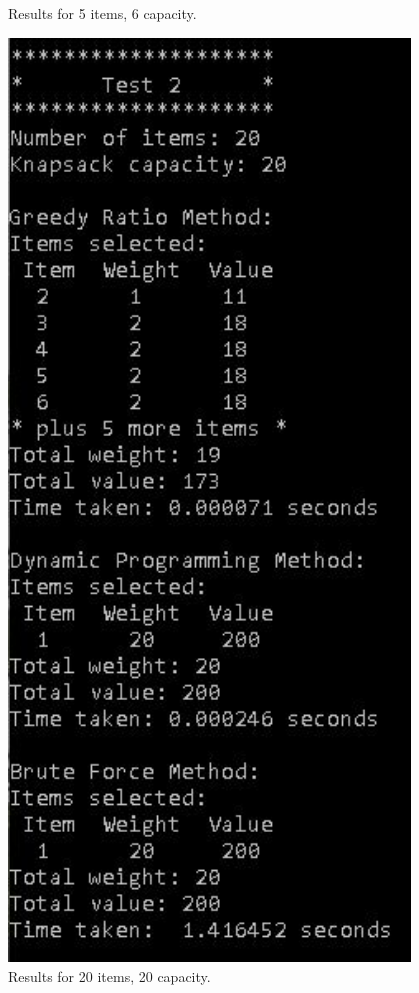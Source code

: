 \documentclass{article}
\begin{document}
\begin{figure}[H]
\begin{minipage}{0.49\textwidth}
        \caption{Results for 5 items, 6 capacity.}
    \end{minipage}\hfill
    \begin{minipage}{0.49\textwidth}
        \centering
        \includegraphics[width=0.95\textwidth]{test2.JPG}
        \caption{Results for 20 items, 20 capacity.}
    \end{minipage}\hfill
\end{figure}
\end{document}
